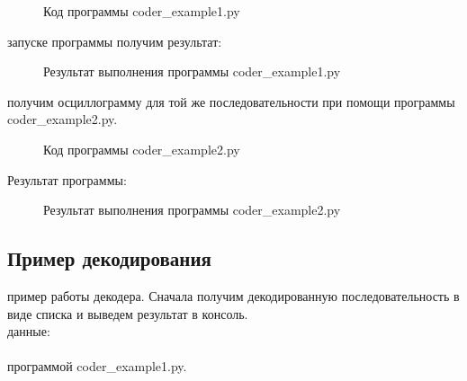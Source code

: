 \documentclass[a4paper14pt]{article}
\begin{document}
\begin{figure}[h!]
    \caption{Код программы coder\_example1.py}
\end{figure}

 запуске программы получим результат:\\
\begin{figure}[h!]
    \caption{Результат выполнения программы coder\_example1.py}
\end{figure}

 получим осциллограмму для той же последовательности при помощи программы coder\_example2.py.

\begin{figure}[h!]
    \caption{Код программы coder\_example2.py}
\end{figure}

\newpage
Результат программы:

\begin{figure}[h]
    \caption{Результат выполнения программы coder\_example2.py}
\end{figure}
\subsection{Пример декодирования}
 пример работы декодера. Сначала получим декодированную последовательность в виде списка и выведем результат в консоль.\\
 данные:\\ 
\indent [1, 0, 1, 0, 1, 0, 1, 0, 1, 0, 1, 0, 1, 0, 1, 0]\\
 программой coder\_example1.py.\\
\end{document}
